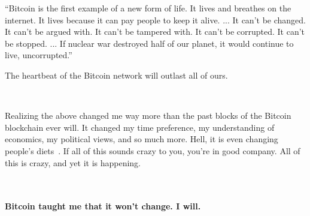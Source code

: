 \begin{chapquote}{\cite{merkle-dao}}
``Bitcoin is the first example of a new form of life. It lives and
breathes on the internet. It lives because it can pay people to keep
it alive. ... It can't be changed. It can't be argued with. It
can't be tampered with. It can't be corrupted. It can't be stopped.
... If nuclear war destroyed half of our planet, it would continue
to live, uncorrupted.''
\end{chapquote}

The heartbeat of the Bitcoin network will outlast all of ours.

~

Realizing the above changed me way more than the past blocks of the Bitcoin
blockchain ever will. It changed my time preference, my understanding of
economics, my political views, and so much more. Hell, it is even changing
people's diets~\cite{carnivores}. If all of this sounds crazy to you, you're in
good company. All of this is crazy, and yet it is happening.

~

\paragraph{Bitcoin taught me that it won't change. I will.}

%
%
%
%
%
%
%
%
%

